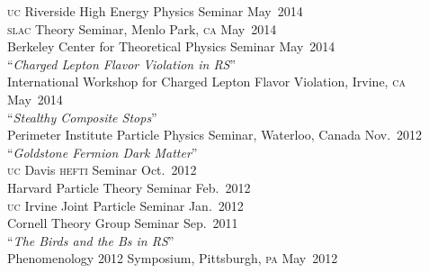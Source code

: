 \documentclass[margin,line]{resume}
\newcommand{\mytalksep}{-.1mm}
\newcommand{\mytalkskip}{2mm}
\newcommand{\scap}[1]{\textsc{\MakeLowercase{#1}}}
\begin{document}
\begin{resume}
%
\scap{UC} Riverside High Energy Physics Seminar
\hfill %
May~2014\vspace{\mytalksep}\\   
%
\scap{SLAC} Theory Seminar, Menlo Park, \scap{CA}
\hfill %
May~2014\vspace{\mytalksep}\\   
%
Berkeley Center for Theoretical Physics Seminar%
\hfill %
May~2014\vspace{\mytalkskip}\\
%
%
%
``\emph{Charged Lepton Flavor Violation in RS}'' 
\vspace{\mytalksep}\\ 
International Workshop for Charged Lepton Flavor Violation, Irvine, \scap{CA}
\hfill %
May~2014\vspace{\mytalkskip}\\ 
%
%
%
``\emph{Stealthy Composite Stops}''
\vspace{\mytalksep}\\   
Perimeter Institute Particle Physics Seminar, Waterloo, Canada
\hfill %
Nov.~2012%
\vspace{\mytalkskip}\\
%
%
%
``\emph{Goldstone Fermion Dark Matter}''
\vspace{\mytalksep}\\   
\scap{UC} Davis \scap{HEFTI} Seminar
\hfill %
Oct.~2012\vspace{\mytalksep}\\   
%
Harvard Particle Theory Seminar%
\hfill %
Feb.~2012\vspace{\mytalksep}\\   
%
\scap{UC} Irvine Joint Particle Seminar
\hfill %
Jan.~2012\vspace{\mytalksep}\\   
%
Cornell Theory Group Seminar
\hfill %
Sep.~2011%
\vspace{\mytalkskip}\\
%
%
%
``\emph{The Birds and the Bs in RS}'' 
\vspace{\mytalksep}\\ 
Phenomenology 2012 Symposium, Pittsburgh, \scap{PA}
\hfill %
May~2012\vspace{\mytalkskip}\\ 
%

\end{resume}
\end{document}
